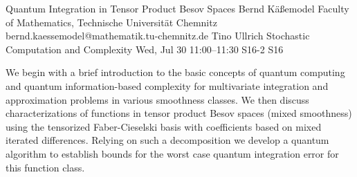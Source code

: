 \begin{talk}
  {Quantum Integration in Tensor Product  Besov Spaces}%
  {Bernd Käßemodel}%
  {Faculty of Mathematics, Technische Universität Chemnitz}%
  {bernd.kaessemodel@mathematik.tu-chemnitz.de}%
  {Tino Ullrich}%
  {Stochastic Computation and Complexity}%
  {Wed, Jul 30 11:00–11:30}%
  {S16-2}%
  {S16}%
				

We begin with a brief introduction to the basic concepts of quantum computing and quantum information-based complexity for multivariate integration and approximation problems in various smoothness classes. We then discuss characterizations of functions in tensor product Besov spaces (mixed smoothness) using the tensorized Faber-Cieselski basis with coefficients based on mixed iterated differences. Relying on such a decomposition we develop a quantum algorithm to establish bounds for the worst case quantum integration error for this function class. 

\medskip
%
%
\end{talk}

